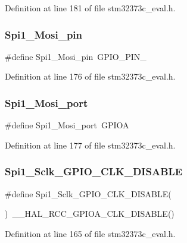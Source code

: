Definition at line 181 of file stm32373c\+\_\+eval.\+h.

\mbox{\label{group___l_e_d_gaf3d4af1e075f99201b13149075a81e51}} 
\subsubsection{Spi1\+\_\+\+Mosi\+\_\+pin}
{\footnotesize\ttfamily \#define Spi1\+\_\+\+Mosi\+\_\+pin~G\+P\+I\+O\+\_\+\+P\+I\+N\+\_}



Definition at line 176 of file stm32373c\+\_\+eval.\+h.

\mbox{\label{group___l_e_d_gaf98f2dc2c9a694a1b3193fc8217759c0}} 
\subsubsection{Spi1\+\_\+\+Mosi\+\_\+port}
{\footnotesize\ttfamily \#define Spi1\+\_\+\+Mosi\+\_\+port~G\+P\+I\+OA}



Definition at line 177 of file stm32373c\+\_\+eval.\+h.

\mbox{\label{group___l_e_d_gabdc4c3034163aef30b0fb74c15d1f77c}} 
\subsubsection{Spi1\+\_\+\+Sclk\+\_\+\+G\+P\+I\+O\+\_\+\+C\+L\+K\+\_\+\+D\+I\+S\+A\+B\+LE}
{\footnotesize\ttfamily \#define Spi1\+\_\+\+Sclk\+\_\+\+G\+P\+I\+O\+\_\+\+C\+L\+K\+\_\+\+D\+I\+S\+A\+B\+LE(\begin{DoxyParamCaption}{ }\end{DoxyParamCaption})~\+\_\+\+\_\+\+H\+A\+L\+\_\+\+R\+C\+C\+\_\+\+G\+P\+I\+O\+A\+\_\+\+C\+L\+K\+\_\+\+D\+I\+S\+A\+B\+LE()}



Definition at line 165 of file stm32373c\+\_\+eval.\+h.

